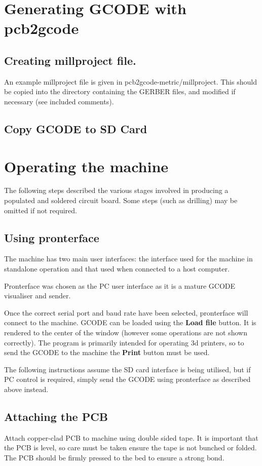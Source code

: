 \documentclass[a4paper,11pt]{article}  %
\begin{document}
\section{Generating GCODE with pcb2gcode}
\subsection{Creating millproject file.}
An example millproject file is given in pcb2gcode-metric/millproject. This should be copied
into the directory containing the GERBER files, and modified if necessary (see included comments).

\subsection{Copy GCODE to SD Card}

\section{Operating the machine}
The following steps described the various stages involved in producing
a populated and soldered circuit board. Some steps (such as drilling)
may be omitted if not required.

\subsection{Using pronterface}
The machine has two main user interfaces: the interface used for the machine in 
standalone operation and that used when connected to a host computer.

Pronterface was chosen as the PC user interface as it is a mature GCODE visualiser
and sender.


Once the correct serial port and baud rate have been selected, pronterface will connect
to the machine. GCODE can be loaded using the \textbf{Load file} button. It is 
rendered to the center of the window (however some operations are not shown correctly).
The program is primarily intended for operating 3d printers, so to send the GCODE
to the machine the \textbf{Print} button must be used.

The following instructions assume the SD card interface is being utilised,
but if PC control is required, simply send the GCODE using pronterface as described above instead.


\subsection{Attaching the PCB}
Attach copper-clad PCB to machine using double sided tape. It is important that the PCB is level,
so care must be taken ensure the tape is not bunched or folded. The PCB should be firmly
pressed to the bed to ensure a strong bond.
\end{document}
